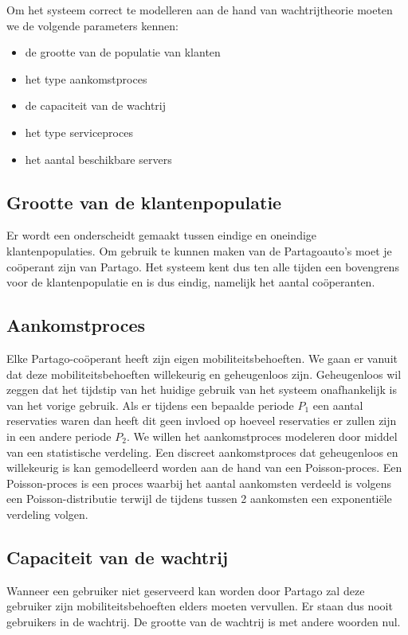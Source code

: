 Om het systeem correct te modelleren aan de hand van wachtrijtheorie moeten we de volgende parameters kennen:
\begin{itemize}
	\item de grootte van de populatie van klanten
	\item het type aankomstproces 
	\item de capaciteit van de wachtrij
	\item het type serviceproces
	\item het aantal beschikbare servers
\end{itemize}

\subsection{Grootte van de klantenpopulatie}
Er wordt een onderscheidt gemaakt tussen eindige en oneindige klantenpopulaties. Om gebruik te kunnen maken van de Partagoauto's moet je coöperant zijn van Partago. Het systeem kent dus ten alle tijden een bovengrens voor de klantenpopulatie en is dus eindig, namelijk het aantal coöperanten.

\subsection{Aankomstproces}
Elke Partago-coöperant heeft zijn eigen mobiliteitsbehoeften. We gaan er vanuit dat deze mobiliteitsbehoeften willekeurig en geheugenloos zijn. Geheugenloos wil zeggen dat het tijdstip van het huidige gebruik van het systeem onafhankelijk is van het vorige gebruik. Als er tijdens een bepaalde periode  $P_{1}$ een aantal reservaties waren dan heeft dit geen invloed op hoeveel reservaties er zullen zijn in een andere periode $P_{2}$. We willen het aankomstproces modeleren door middel van een statistische verdeling. Een discreet aankomstproces dat geheugenloos en willekeurig is kan gemodelleerd worden aan de hand van een Poisson-proces. Een Poisson-proces is een proces waarbij het aantal aankomsten verdeeld is volgens een Poisson-distributie terwijl de tijdens tussen 2 aankomsten een exponentiële verdeling volgen.

\subsection{Capaciteit van de wachtrij}
Wanneer een gebruiker niet geserveerd kan worden door Partago zal deze gebruiker zijn mobiliteitsbehoeften elders moeten vervullen. Er staan dus nooit gebruikers in de wachtrij. De grootte van de wachtrij is met andere woorden nul.


